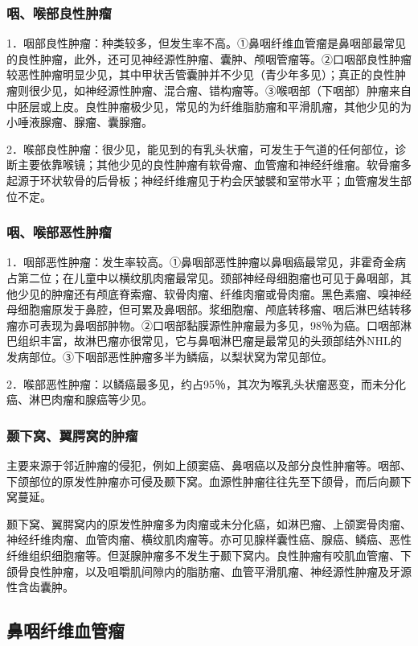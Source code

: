 \subsubsection{咽、喉部良性肿瘤}

1．咽部良性肿瘤：种类较多，但发生率不高。①鼻咽纤维血管瘤是鼻咽部最常见的良性肿瘤，此外，还可见神经源性肿瘤、囊肿、颅咽管瘤等。②口咽部良性肿瘤较恶性肿瘤明显少见，其中甲状舌管囊肿并不少见（青少年多见）；真正的良性肿瘤则很少见，如神经源性肿瘤、混合瘤、错构瘤等。③喉咽部（下咽部）肿瘤来自中胚层或上皮。良性肿瘤极少见，常见的为纤维脂肪瘤和平滑肌瘤，其他少见的为小唾液腺瘤、腺瘤、囊腺瘤。

2．喉部良性肿瘤：很少见，能见到的有乳头状瘤，可发生于气道的任何部位，诊断主要依靠喉镜；其他少见的良性肿瘤有软骨瘤、血管瘤和神经纤维瘤。软骨瘤多起源于环状软骨的后骨板；神经纤维瘤见于杓会厌皱襞和室带水平；血管瘤发生部位不定。

\subsubsection{咽、喉部恶性肿瘤}

1．咽部恶性肿瘤：发生率较高。①鼻咽部恶性肿瘤以鼻咽癌最常见，非霍奇金病占第二位；在儿童中以横纹肌肉瘤最常见。颈部神经母细胞瘤也可见于鼻咽部，其他少见的肿瘤还有颅底脊索瘤、软骨肉瘤、纤维肉瘤或骨肉瘤。黑色素瘤、嗅神经母细胞瘤原发于鼻腔，但可累及鼻咽部。浆细胞瘤、颅底转移瘤、咽后淋巴结转移瘤亦可表现为鼻咽部肿物。②口咽部黏膜源性肿瘤最为多见，98％为癌。口咽部淋巴组织丰富，故淋巴瘤亦很常见，它与鼻咽淋巴瘤是最常见的头颈部结外NHL的发病部位。③下咽部恶性肿瘤多半为鳞癌，以梨状窝为常见部位。

2．喉部恶性肿瘤：以鳞癌最多见，约占95％，其次为喉乳头状瘤恶变，而未分化癌、淋巴肉瘤和腺癌等少见。

\subsubsection{颞下窝、翼腭窝的肿瘤}

主要来源于邻近肿瘤的侵犯，例如上颌窦癌、鼻咽癌以及部分良性肿瘤等。咽部、下颌部位的原发性肿瘤亦可侵及颞下窝。血源性肿瘤往往先至下颌骨，而后向颞下窝蔓延。

颞下窝、翼腭窝内的原发性肿瘤多为肉瘤或未分化癌，如淋巴瘤、上颌窦骨肉瘤、神经纤维肉瘤、血管肉瘤、横纹肌肉瘤等。亦可见腺样囊性癌、腺癌、鳞癌、恶性纤维组织细胞瘤等。但涎腺肿瘤多不发生于颞下窝内。良性肿瘤有咬肌血管瘤、下颌骨良性肿瘤，以及咀嚼肌间隙内的脂肪瘤、血管平滑肌瘤、神经源性肿瘤及牙源性含齿囊肿。

\subsection{鼻咽纤维血管瘤}

